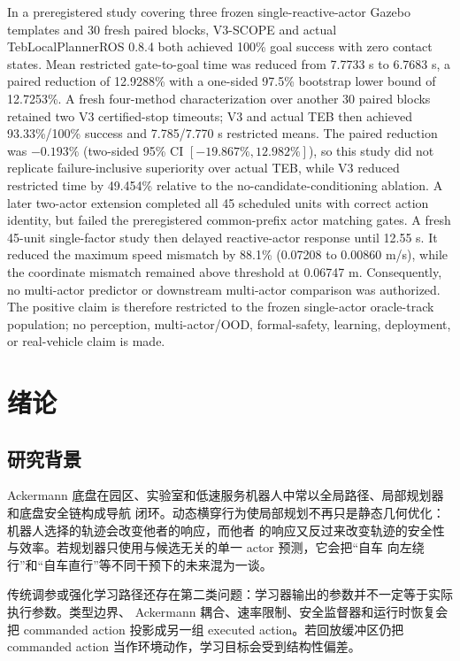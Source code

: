 \documentclass[12pt,a4paper,oneside]{report}
\begin{document}
In a preregistered study covering three frozen single-reactive-actor Gazebo templates and 30 fresh
paired blocks, V3-SCOPE and actual TebLocalPlannerROS 0.8.4 both achieved 100\% goal success with
zero contact states. Mean restricted gate-to-goal time was reduced from 7.7733 s to 6.7683 s, a
paired reduction of 12.9288\% with a one-sided 97.5\% bootstrap lower bound of 12.7253\%. A fresh
four-method characterization over another 30 paired blocks retained two V3 certified-stop timeouts;
V3 and actual TEB then achieved 93.33\%/100\% success and 7.785/7.770 s restricted means. The
paired reduction was $-0.193\%$ (two-sided 95\% CI $[-19.867\%,12.982\%]$), so this study did not
replicate failure-inclusive superiority over actual TEB, while V3 reduced restricted time by
49.454\% relative to the no-candidate-conditioning ablation. A later
two-actor extension completed all 45 scheduled units with correct action identity, but failed the
preregistered common-prefix actor matching gates. A fresh 45-unit single-factor study then delayed
reactive-actor response until 12.55 s. It reduced the maximum speed mismatch by 88.1\% (0.07208 to
0.00860 m/s), while the coordinate mismatch remained above threshold at 0.06747 m. Consequently,
no multi-actor predictor or downstream multi-actor comparison was authorized. The positive claim is therefore restricted to
the frozen single-actor oracle-track population; no perception, multi-actor/OOD, formal-safety,
learning, deployment, or real-vehicle claim is made.

\tableofcontents
\listoftables
\listoffigures
\clearpage
{}

\chapter{绪论}
\section{研究背景}
Ackermann 底盘在园区、实验室和低速服务机器人中常以全局路径、局部规划器和底盘安全链构成导航
闭环。动态横穿行为使局部规划不再只是静态几何优化：机器人选择的轨迹会改变他者的响应，而他者
的响应又反过来改变轨迹的安全性与效率。若规划器只使用与候选无关的单一 actor 预测，它会把“自车
向左绕行”和“自车直行”等不同干预下的未来混为一谈。

传统调参或强化学习路径还存在第二类问题：学习器输出的参数并不一定等于实际执行参数。类型边界、
Ackermann 耦合、速率限制、安全监督器和运行时恢复会把 commanded action 投影成另一组 executed
action。若回放缓冲区仍把 commanded action 当作环境动作，学习目标会受到结构性偏差。
\end{document}
